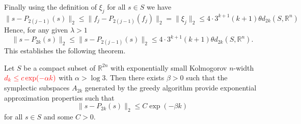 Finally using the definition of $\xi_j$ for all $s\in S$ we have
\begin{equation} \label{eq:new21}
	\| s - P_{2(j-1)}(s) \|_2 \leq \| f_j - P_{2(j-1)}(f_j) \|_2 = \|\xi_j \|_2 \leq 4\cdot 3^{k+1} (k+1) \theta d_{2k}(S,\mathbb R^n)
\end{equation}
Hence, for any given $\lambda > 1$
\begin{equation} \label{eq:new22}
	\| s - P_{2k}(s) \|_2 \leq \| s - P_{2(j-1)}(s) \|_2 \leq 4\cdot 3^{k+1} (k+1) \theta d_{2k}(S,\mathbb R^n).
\end{equation}
This establishes the following theorem.
\begin{theorem} \label{theorem:SyMo:2}
	Let $S$ be a compact subset of $\mathbb{R}^{2n}$ with exponentially small Kolmogorov $n$-width $\color{red} d_{k}\leq c\exp(-\alpha k)$ with $\alpha > \log3$. Then there exists $\beta>0$ such that the symplectic subspaces $A_{2k}$ generated by the greedy algorithm provide exponential approximation properties such that
\begin{equation} \label{eq:new23}
	\| s - P_{2k}(s) \|_2 \leq C \exp(-\beta k)
\end{equation}
for all $s\in S$ and some $C>0$.
\end{theorem}


